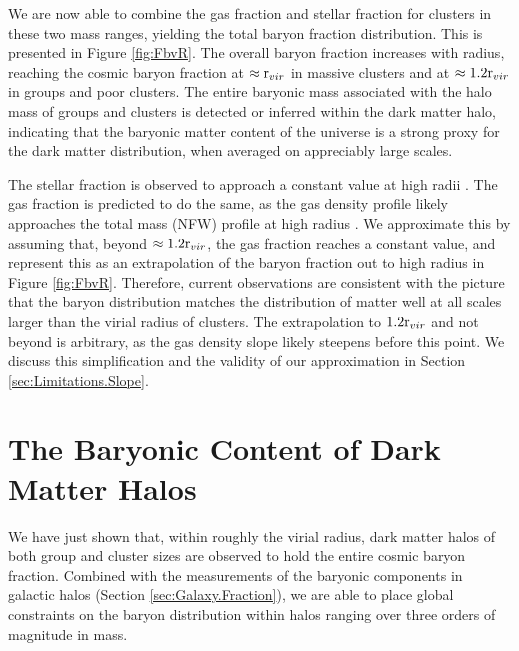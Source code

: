 We are now able to combine the gas fraction and stellar fraction for
clusters in these two mass ranges, yielding the total baryon fraction
distribution. This is presented in Figure \ref{fig:FbvR}. The overall
baryon fraction increases with radius, reaching the cosmic baryon
fraction at $\approx\textrm{r\ensuremath{_{vir}}}{}$ in massive clusters and at
$\approx1.2\textrm{r\ensuremath{_{vir}}}{}$ in groups and poor clusters. The entire baryonic
mass associated with the halo mass of groups and clusters is detected
or inferred within the dark matter halo, indicating that the baryonic
matter content of the universe is a strong proxy for the dark matter
distribution, when averaged on appreciably large scales.



The stellar fraction is observed to approach a constant value at high
radii \citep{Bahcall2014}. The gas fraction is predicted to do the
same, as the gas density profile likely approaches the total mass
(NFW) profile at high radius \citep[e.g.,][and
  refs.~therein]{Umetsu2009}.  We approximate this by assuming that,
beyond $\approx 1.2\textrm{r\ensuremath{_{vir}}}{}$, the gas fraction reaches a constant
value, and represent this as an extrapolation of the baryon fraction
out to high radius in Figure \ref{fig:FbvR}. Therefore, current
observations are consistent with the picture that the baryon
distribution matches the distribution of matter well at all scales
larger than the virial radius of clusters. The extrapolation to
$1.2\textrm{r\ensuremath{_{vir}}}$ and not beyond is arbitrary, as the gas density slope
likely steepens before this point. We discuss this simplification and
the validity of our approximation in Section
\ref{sec:Limitations.Slope}.

\section{The Baryonic Content of Dark Matter Halos}
\label{sec:Baryonic}

We have just shown that, within roughly the virial radius, dark matter
halos of both group and cluster sizes are observed to hold the entire
cosmic baryon fraction. Combined with the measurements of the baryonic
components in galactic halos (Section \ref{sec:Galaxy.Fraction}), we
are able to place global constraints on the baryon distribution within
halos ranging over three orders of magnitude in mass.

